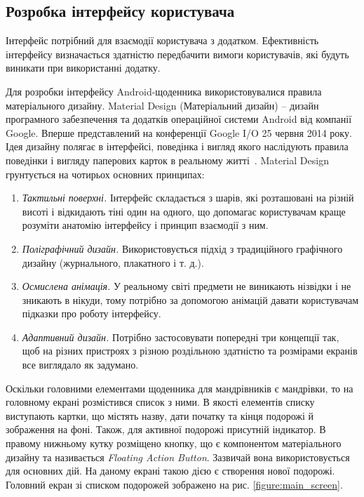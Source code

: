 \documentclass[../main.tex]{subfiles}
\begin{document}
\subsection{Розробка інтерфейсу користувача}
Інтерфейс потрібний для взаємодії користувача з додатком. Ефективність інтерфейсу визначається здатністю передбачити вимоги користувачів, які будуть виникати при використанні додатку. 

Для розробки інтерфейсу Android-щоденника використовувалися правила матеріального дизайну. Material Design (Матеріальний дизайн) -- дизайн програмного забезпечення та додатків операційної системи Android від компанії Google. Вперше представлений на конференції Google I/O 25 червня 2014 року.  Ідея дизайну полягає в інтерфейсі, поведінка і вигляд якого наслідують правила поведінки і вигляду паперових карток в реальному житті~\cite{materail_design}. Material Design грунтується на чотирьох основних принципах:

\begin{enumerate}
	\item \textit{Тактильні поверхні.} Інтерфейс складається з шарів, які розташовані на різній висоті і відкидають тіні один на одного, що допомагає користувачам краще розуміти анатомію інтерфейсу і принцип взаємодії з ним.
	\item \textit{Поліграфічний дизайн.} Використовується підхід з традиційного графічного дизайну (журнального, плакатного і т. д.).
	\item \textit{Осмислена анімація.} У реальному світі предмети не виникають нізвідки і не зникають в нікуди, тому потрібно за допомогою анімацій давати користувачам підказки про роботу інтерфейсу.
	\item \textit{Адаптивний дизайн.} Потрібно застосовувати попередні три концепції так, щоб на різних пристроях з різною роздільною здатністю та розмірами екранів все виглядало як задумано.
\end{enumerate}

Оскільки головними елементами щоденника для мандрівників є мандрівки, то на головному екрані розмістився список з ними. В якості елементів списку виступають картки, що містять назву, дати початку та кінця подорожі й зображення на фоні. Також, для активної подорожі присутній індикатор. В правому нижньому кутку розміщено кнопку, що є компонентом матеріального дизайну та називається \textit{Floating Action Button}. Зазвичай вона використовується для основних дій. На даному екрані такою дією є створення нової подорожі. Головний екран зі списком подорожей зображено на рис. \ref{figure:main_screen}.
\end{document}
